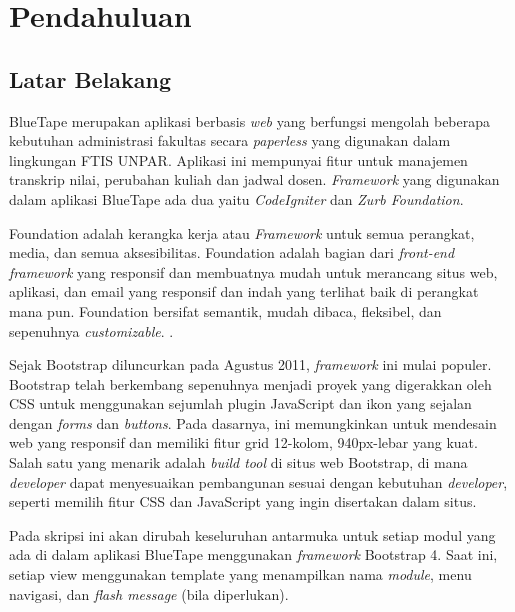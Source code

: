 \chapter{Pendahuluan}
\label{chap:intro}
   
\section{Latar Belakang}
\label{sec:label}


\par BlueTape merupakan aplikasi berbasis \textit{web} yang berfungsi mengolah beberapa kebutuhan administrasi fakultas secara \textit{paperless} yang digunakan dalam lingkungan FTIS UNPAR.  Aplikasi ini mempunyai fitur untuk manajemen transkrip nilai, perubahan kuliah dan jadwal dosen. \textit{Framework} yang digunakan dalam aplikasi BlueTape ada dua yaitu \textit{CodeIgniter} dan \textit{Zurb Foundation}.  \par
Foundation adalah kerangka kerja atau \textit{Framework }  untuk semua perangkat, media, dan semua aksesibilitas. Foundation adalah bagian dari \textit{front-end framework}  yang responsif dan membuatnya mudah untuk merancang situs web, aplikasi, dan email yang responsif dan indah yang terlihat baik di perangkat mana pun. Foundation bersifat semantik, mudah dibaca, fleksibel, dan sepenuhnya \textit{customizable}.
\cite{zurbfoundation:17}.\par
Sejak Bootstrap diluncurkan pada Agustus 2011, \textit{framework} ini mulai populer. Bootstrap telah berkembang sepenuhnya menjadi proyek yang digerakkan oleh CSS untuk menggunakan sejumlah plugin JavaScript dan ikon yang sejalan dengan \textit{forms} dan \textit{buttons}. Pada dasarnya, ini memungkinkan untuk mendesain web yang responsif dan memiliki fitur grid 12-kolom, 940px-lebar yang kuat. Salah satu yang menarik adalah \textit{build tool} di situs web Bootstrap, di mana \textit{developer} dapat menyesuaikan pembangunan sesuai dengan kebutuhan \textit{developer}, seperti memilih fitur CSS dan JavaScript yang ingin disertakan dalam situs. \cite{bootstrap:19}\par
Pada skripsi ini akan dirubah keseluruhan  antarmuka untuk setiap modul yang ada di dalam aplikasi BlueTape menggunakan \textit{framework} Bootstrap 4. Saat ini, setiap view menggunakan template yang menampilkan nama \textit{module}, menu navigasi, dan \textit{flash message} (bila diperlukan).


